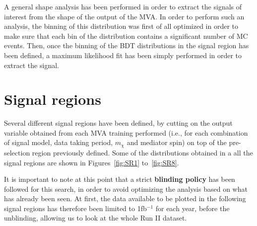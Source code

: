 \documentclass[a4paper, 10pt, openright]{report}
\begin{document}
A general shape analysis has been performed in order to extract the signals of interest from the shape of the output of the \ac{MVA}. In order to perform such an analysis, the binning of this distribution was first of all optimized in order to make sure that each bin of the distribution contains a significant number of \ac{MC} events. Then, once the binning of the \ac{BDT} distributions in the signal region has been defined, a maximum likelihood fit has been simply performed in order to extract the signal.


\section{Signal regions} \label{section:SR}

Several different signal regions have been defined, by cutting on the output variable obtained from each \ac{MVA} training performed (i.e., for each combination of signal model, data taking period, $m_\chi$ and mediator spin) on top of the pre-selection region previously defined. Some of the distributions obtained in a all the signal regions are shown in Figures~\ref{fig:SR1} to~\ref{fig:SR8}.

It is important to note at this point that a strict \textbf{blinding policy} has been followed for this search, in order to avoid optimizing the analysis based on what has already been seen. At first, the data available to be plotted in the following signal regions has therefore been limited to 1fb$^{-1}$ for each year, before the unblinding, allowing us to look at the whole Run II dataset. %

\end{document}
